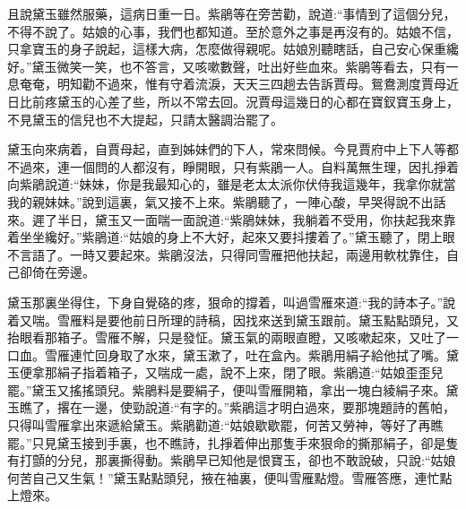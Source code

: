 \begin{parag}
    且說黛玉雖然服藥，這病日重一日。紫鵑等在旁苦勸，說道:“事情到了這個分兒，不得不說了。姑娘的心事，我們也都知道。至於意外之事是再沒有的。姑娘不信，只拿寶玉的身子說起，這樣大病，怎麼做得親呢。姑娘別聽瞎話，自己安心保重纔好。”黛玉微笑一笑，也不答言，又咳嗽數聲，吐出好些血來。紫鵑等看去，只有一息奄奄，明知勸不過來，惟有守着流淚，天天三四趟去告訴賈母。鴛鴦測度賈母近日比前疼黛玉的心差了些，所以不常去回。況賈母這幾日的心都在寶釵寶玉身上，不見黛玉的信兒也不大提起，只請太醫調治罷了。
\end{parag}


\begin{parag}
    黛玉向來病着，自賈母起，直到姊妹們的下人，常來問候。今見賈府中上下人等都不過來，連一個問的人都沒有，睜開眼，只有紫鵑一人。自料萬無生理，因扎掙着向紫鵑說道:“妹妹，你是我最知心的，雖是老太太派你伏侍我這幾年，我拿你就當我的親妹妹。”說到這裏，氣又接不上來。紫鵑聽了，一陣心酸，早哭得說不出話來。遲了半日，黛玉又一面喘一面說道:“紫鵑妹妹，我躺着不受用，你扶起我來靠着坐坐纔好。”紫鵑道:“姑娘的身上不大好，起來又要抖摟着了。”黛玉聽了，閉上眼不言語了。一時又要起來。紫鵑沒法，只得同雪雁把他扶起，兩邊用軟枕靠住，自己卻倚在旁邊。
\end{parag}


\begin{parag}
    黛玉那裏坐得住，下身自覺硌的疼，狠命的撐着，叫過雪雁來道:“我的詩本子。”說着又喘。雪雁料是要他前日所理的詩稿，因找來送到黛玉跟前。黛玉點點頭兒，又抬眼看那箱子。雪雁不解，只是發怔。黛玉氣的兩眼直瞪，又咳嗽起來，又吐了一口血。雪雁連忙回身取了水來，黛玉漱了，吐在盒內。紫鵑用絹子給他拭了嘴。黛玉便拿那絹子指着箱子，又喘成一處，說不上來，閉了眼。紫鵑道:“姑娘歪歪兒罷。”黛玉又搖搖頭兒。紫鵑料是要絹子，便叫雪雁開箱，拿出一塊白綾絹子來。黛玉瞧了，撂在一邊，使勁說道:“有字的。”紫鵑這才明白過來，要那塊題詩的舊帕，只得叫雪雁拿出來遞給黛玉。紫鵑勸道:“姑娘歇歇罷，何苦又勞神，等好了再瞧罷。”只見黛玉接到手裏，也不瞧詩，扎掙着伸出那隻手來狠命的撕那絹子，卻是隻有打顫的分兒，那裏撕得動。紫鵑早已知他是恨寶玉，卻也不敢說破，只說:“姑娘何苦自己又生氣！”黛玉點點頭兒，掖在袖裏，便叫雪雁點燈。雪雁答應，連忙點上燈來。
\end{parag}



